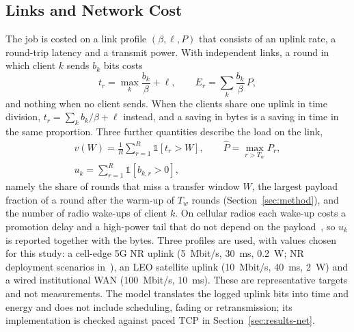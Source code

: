 \documentclass[journal]{IEEEtran}
\begin{document}
\subsection{Links and Network Cost}
\label{sec:netmodel}
The job is costed on a link profile $(\beta,\ell,P)$ that consists of an uplink rate, a round-trip latency and a transmit power. With independent links, a round in which client $k$ sends $b_k$ bits costs
\begin{equation}
t_r=\max_k\frac{b_k}{\beta}+\ell,\qquad E_r=\sum_k\frac{b_k}{\beta}\,P,
\label{eq:netcost}
\end{equation}
and nothing when no client sends. When the clients share one uplink in time division, $t_r=\sum_kb_k/\beta+\ell$ instead, and a saving in bytes is a saving in time in the same proportion. Three further quantities describe the load on the link,
\begin{equation}
\begin{gathered}
v(W)=\frac1R\sum_{r=1}^R\mathbb 1[t_r>W],\qquad \hat P=\max_{r>T_w}P_r,\\
u_k=\sum_{r=1}^R\mathbb 1[b_{k,r}>0],
\end{gathered}
\label{eq:netmetrics}
\end{equation}
namely the share of rounds that miss a transfer window $W$, the largest payload fraction of a round after the warm-up of $T_w$ rounds (Section~\ref{sec:method}), and the number of radio wake-ups of client $k$. On cellular radios each wake-up costs a promotion delay and a high-power tail that do not depend on the payload~\cite{huang2012lte,narayanan2021variegated}, so $u_k$ is reported together with the bytes. Three profiles are used, with values chosen for this study: a cell-edge 5G NR uplink (5~Mbit/s, 30~ms, 0.2~W; NR deployment scenarios in~\cite{tr38913}), an LEO satellite uplink (10~Mbit/s, 40~ms, 2~W) and a wired institutional WAN (100~Mbit/s, 10~ms). These are representative targets and not measurements. The model translates the logged uplink bits into time and energy and does not include scheduling, fading or retransmission; its implementation is checked against paced TCP in Section~\ref{sec:results-net}.
\end{document}
